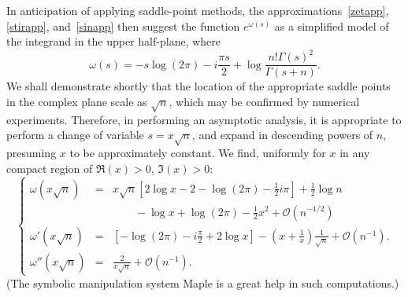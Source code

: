 \documentclass{amsart}
\def\ds{\displaystyle}
\begin{document}
In anticipation of applying saddle-point methods, 
the approximations~\eqref{zetapp}, \eqref{stirapp}, and~\eqref{sinapp}
then suggest the function $e^{\omega(s)}$
 as a simplified model of the integrand in the upper half-plane, where
\begin{equation}\label{omdef}
\omega(s)=-s\log(2\pi)-i\frac{\pi s}{2}+\log\frac{n! \Gamma(s)^2}{\Gamma(s+n)}.
\end{equation}
We shall demonstrate shortly that the location of the appropriate saddle 
points in the complex plane scale as $\sqrt{n}$, which may be confirmed 
by numerical experiments. Therefore, in performing an asymptotic analysis,
it is appropriate to perform a change of variable $s=x\sqrt{n}$, 
and expand in descending powers of $n$, presuming $x$ to be approximately constant.
We find, uniformly for $x$ in any compact region of $\Re(x)>0$, $\Im(x)>0$:
\begin{equation}\label{om012}
\left\{\begin{array}{lll}
\omega(x\sqrt{n})&=&\ds x\sqrt{n}\left[2\log x-2-\log(2\pi)-\frac12i\pi \right]+\frac12\log n
\\
&&\ds \qquad -\log x +\log(2\pi)-\frac12x^2+\mathcal{O}(n^{-1/2})
\\
\omega'(x\sqrt{n})&=& \ds \left[-\log(2\pi) -i\frac{\pi}{2}+2\log x\right]
-\left(x+\frac1x\right)\frac{1}{\sqrt{n}}+\mathcal{O}(n^{-1}).
\\
\omega''(x\sqrt{n})&=&\ds \frac{2}{x\sqrt{n}}+\mathcal{O}(n^{-1}).
\end{array}\right. 
\end{equation}
(The symbolic manipulation system {\sc Maple} is a great help in such computations.)
\end{document}
